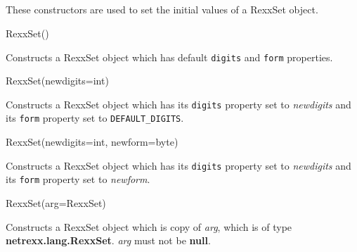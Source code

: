 \subsection{}\label{"id"}
 
These constructors are used to set the initial values of a RexxSet
object.
\begin{description}
\item{RexxSet()}

Constructs a RexxSet object which has default \texttt{digits} and
\texttt{form} properties.
\item{RexxSet(newdigits=int)}

Constructs a RexxSet object which has its \texttt{digits} property set
to \emph{newdigits} and its \texttt{form} property set
to \texttt{DEFAULT\_DIGITS}.
\item{RexxSet(newdigits=int, newform=byte)}

Constructs a RexxSet object which has its \texttt{digits} property set
to \emph{newdigits} and its \texttt{form} property set to
\emph{newform}.
\item{RexxSet(arg=RexxSet)}

Constructs a RexxSet object which is copy of \emph{arg}, which is of
type \textbf{netrexx.lang.RexxSet}.
\emph{arg} must not be \textbf{null}.
\end{description}
\subsection{}\label{"id"}
 
